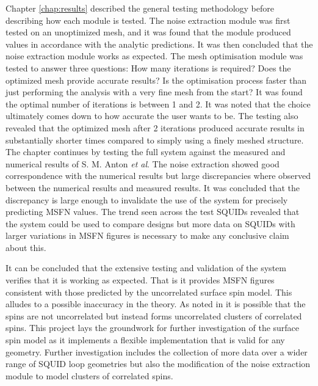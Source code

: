 \par
Chapter \ref{chap:results} described the general testing methodology before describing how each module is tested. The noise extraction module was first tested on an unoptimized mesh, and it was found that the module produced values in accordance with the analytic predictions. It was then concluded that the noise extraction module works as expected. The mesh optimisation module was tested to answer three questions: How many iterations is required? Does the optimized mesh provide accurate results? Is the optimisation process faster than just performing the analysis with a very fine mesh from the start? It was found the optimal number of iterations is between 1 and 2. It was noted that the choice ultimately comes down to how accurate the user wants to be. The testing also revealed that the optimized mesh after 2 iterations produced accurate results in substantially shorter times compared to simply using a finely meshed structure. The chapter continues by testing the full system against the measured and numerical results of S. M. Anton \textit{et al}. The noise extraction showed good correspondence with the numerical results but large discrepancies where observed between the numerical results and measured results. It was concluded that the discrepancy is large enough to invalidate the use of the system for precisely predicting MSFN values. The trend seen across the test SQUIDs revealed that the system could be used to compare designs but more data on SQUIDs with larger variations in MSFN figures is necessary to make any conclusive claim about this.
\par
It can be concluded that the extensive testing and validation of the system verifies that it is working as expected. That is it provides MSFN figures consistent with those predicted by the uncorrelated surface spin model. This alludes to a possible inaccuracy in the theory. As noted in \cite{fluxNoiseSquidsStevenAnton} it is possible that the spins are not uncorrelated but instead forms uncorrelated clusters of correlated spins. This project lays the groundwork for further investigation of the surface spin model as it implements a flexible implementation that is valid for any geometry. Further investigation includes the collection of more data over a wider range of SQUID loop geometries but also the modification of the noise extraction module to model clusters of correlated spins.
